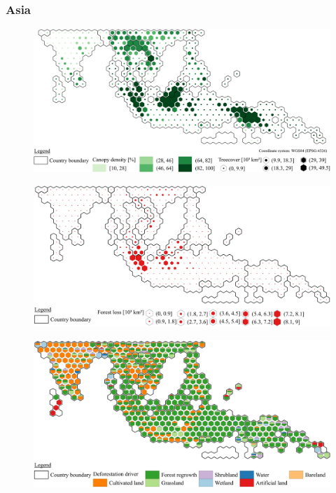         \subsubsection{Asia}
    	    \begin{figure}[ht]
		        \centering
		        \includegraphics[scale=1]{img/asia_treecover_frameless}
		        \caption[Ecosystem service values]{}
		        \label{fig:asiacover}
	        \end{figure}
	        \begin{figure}[ht]
		        \centering
		        \includegraphics[scale=1]{img/asia_loss_frameless}
		        \caption[Ecosystem service values]{}
		        \label{fig:asialoss}
	        \end{figure}
	        \begin{figure}[ht]
		        \centering
		        \includegraphics[scale=1]{img/asia_driver_frameless}
		        \caption[Ecosystem service values]{}
		        \label{fig:asiadriver}
	        \end{figure}
        
